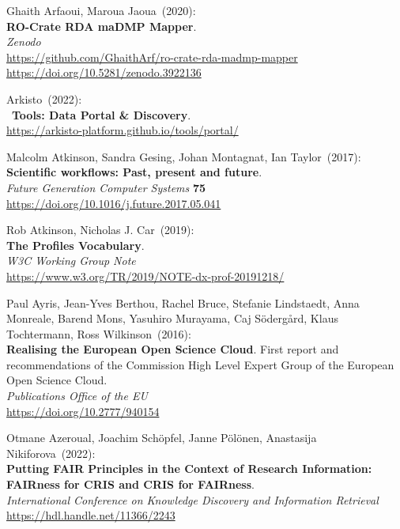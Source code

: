 \begin{thebibliography}{9}
Ghaith Arfaoui, Maroua Jaoua~(2020): \\
\textbf{RO-Crate RDA maDMP Mapper}.\\
\emph{Zenodo}\\
\url{https://github.com/GhaithArf/ro-crate-rda-madmp-mapper}\\
\url{https://doi.org/10.5281/zenodo.3922136}

Arkisto~(2022): \\
~\textbf{Tools: Data Portal \& Discovery}.\\
\url{https://arkisto-platform.github.io/tools/portal/}

Malcolm Atkinson, Sandra Gesing, Johan Montagnat, Ian Taylor~(2017): \\
\textbf{Scientific workflows: Past, present and future}.\\
\emph{Future Generation Computer Systems} \textbf{75}\\
\url{https://doi.org/10.1016/j.future.2017.05.041}

Rob Atkinson, Nicholas J. Car~(2019): \\
\textbf{The Profiles Vocabulary}.\\
\emph{W3C Working Group Note}\\
\url{https://www.w3.org/TR/2019/NOTE-dx-prof-20191218/}

Paul Ayris, Jean-Yves Berthou, Rachel Bruce, Stefanie Lindstaedt, Anna Monreale, Barend Mons, Yasuhiro Murayama, Caj Södergård, Klaus Tochtermann, Ross Wilkinson~(2016): \\
\textbf{Realising the European Open Science Cloud}. 
First report and recommendations of the Commission High Level Expert Group of the European Open Science Cloud.\\
\emph{Publications Office of the EU} \\
\url{https://doi.org/10.2777/940154}

Otmane Azeroual, Joachim Schöpfel, Janne Pölönen, Anastasija Nikiforova~(2022): \\
\textbf{Putting FAIR Principles in the Context of Research Information: FAIRness for CRIS and CRIS for FAIRness}.\\
\textit{International Conference on Knowledge Discovery and Information Retrieval}\\
\url{https://hdl.handle.net/11366/2243}


\end{thebibliography}
